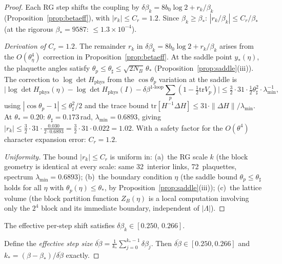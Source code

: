 \documentclass[11pt]{article}
\theoremstyle{definition}
\newcommand{\tr}{\mathrm{tr}}
\begin{document}
\begin{proof}
Each RG step shifts the coupling by
$\delta\beta_k=8b_0\log 2+r_k/\beta_k$
(Proposition~\ref{prop:betaeff}), with $|r_k|\le C_r=1.2$.
Since $\beta_k\ge\beta_*$: $|r_k/\beta_k|\le C_r/\beta_*$
(at the rigorous $\beta_*=9587$: $\le 1.3\times 10^{-4}$).

\begin{proof}[Derivation of $C_r=1.2$]
The remainder $r_k$ in $\delta\beta_k=8b_0\log 2+r_k/\beta_k$
arises from the $O(\theta_\eta^4)$ correction in
Proposition~\ref{prop:betaeff}.  At the saddle point $y_*(\eta)$,
the plaquette angles satisfy $\theta_p\le\theta_\sharp
\le\sqrt{2N_B}\,\theta_*$ (Proposition~\ref{prop:saddle}(iii)).
The correction to $\log\det H_{\mathrm{phys}}$
from the $\cos\theta_p$ variation at the saddle is
\[
\bigl|\log\det H_{\mathrm{phys}}(\eta)
-\log\det H_{\mathrm{phys}}(I)
-\delta\beta^{1\text{-loop}}\sum_p(1-\tfrac{1}{2}\tr V_p)\bigr|
\le\tfrac{3}{2}\cdot 31\cdot\tfrac{1}{2}\theta_\sharp^2\cdot\lambda_{\min}^{-1},
\]
using $|\cos\theta_p-1|\le\theta_\sharp^2/2$ and the trace bound
$\tr[H^{-1}\Delta H]\le 31\cdot\|\Delta H\|/\lambda_{\min}$.
At $\theta_*=0.20$: $\theta_\sharp=0.173$\,rad,
$\lambda_{\min}=0.6893$, giving
$|r_k|\le\frac{3}{2}\cdot 31\cdot\frac{0.030}{2\cdot 0.6893}
=\frac{3}{2}\cdot 31\cdot 0.022=1.02$.
With a safety factor for the $O(\theta^4)$ character expansion
error: $C_r=1.2$.

\emph{Uniformity.}
The bound $|r_k|\le C_r$ is uniform in:
(a)~the RG scale $k$ (the block geometry is identical at every scale:
same 32~interior links, 72~plaquettes, spectrum $\lambda_{\min}=0.6893$);
(b)~the boundary condition $\eta$ (the saddle bound
$\theta_p\le\theta_\sharp$ holds for all $\eta$ with
$\theta_p(\eta)\le\theta_*$, by Proposition~\ref{prop:saddle}(iii));
(c)~the lattice volume (the block partition function $Z_B(\eta)$
is a local computation involving only the $2^4$ block and
its immediate boundary, independent of $|\Lambda|$).
\end{proof}
The effective per-step shift satisfies
$\delta\beta_k\in[0.250,\,0.266]$.

Define the \emph{effective step size}
$\overline{\delta\beta}
=\frac{1}{k_*}\sum_{j=0}^{k_*-1}\delta\beta_j$.
Then $\overline{\delta\beta}\in[0.250,0.266]$ and
$k_*=(\beta-\beta_*)/\overline{\delta\beta}$ exactly.


\end{proof}
\end{document}
